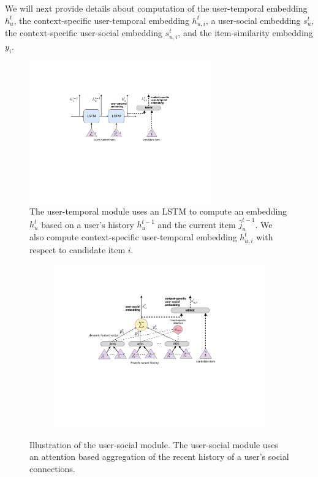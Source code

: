 We will next provide details about
computation of the user-temporal embedding $h_u^t$, the context-specific user-temporal embedding $h_{u,i}^t$, a user-social embedding $s_u^t$, the context-specific user-social embedding $s_{u,i}^t$, and the item-similarity embedding ${y}_i$.

\begin{figure}[tbh]
  \centering
\includegraphics[width=0.7\textwidth]{figures/Temporal_new}
\caption{The user-temporal module uses an LSTM to compute an embedding $h_u^t$ based on a user's history $h_u^{t-1}$ and the current item $\hat{j}_u^{t-1}$. We also compute context-specific user-temporal embedding $h_{u,i}^{t}$ with respect to  candidate item $i$.}
\label{fig:temporal}
\end{figure}

\begin{figure}[tbh]
\begin{subfigure}[c]{\linewidth}
\centering
  \includegraphics[scale=0.75]{figures/UserSocial_new}
  \label{fig:user}
\end{subfigure}
\caption{Illustration of the user-social module. The user-social module uses an attention based aggregation of the recent history of a user's social connections.}
\end{figure}

